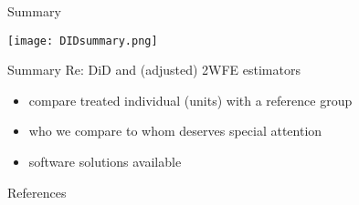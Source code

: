 \documentclass[aspectratio=169]{beamer}
\begin{document}
		\begin{frame}{Summary}
			\begin{center}
				\texttt{[image: DIDsummary.png]}
			\end{center}
		\end{frame}

		\begin{frame}{Summary}
			Re: DiD and (adjusted) 2WFE estimators \\ \vspace*{.5cm}
			\begin{itemize}
				\item compare treated individual (units) with a reference group
				\item who we compare to whom deserves special attention
				\item software solutions available
			\end{itemize}
		\end{frame}

	\begin{frame}[t,allowframebreaks]{References}
	  \printbibliography
	\end{frame}
\end{document}
